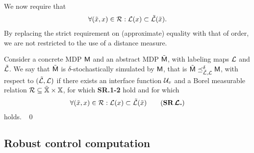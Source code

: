 \documentclass{ifacconf}
\begin{document}
 
We now require that \begin{equation}
  \forall (\tilde x,x )\in \mathcal{R}:  \mathcal{L}(x)\subset \tilde{\mathcal{L}}(\tilde x).
  \end{equation} 
By replacing the strict requirement on (approximate) equality with that of order,   we are not restricted to the use of a distance measure. %
 

\begin{definition}\label{def:apbsim}
Consider a concrete MDP $\mathsf{M}$ and an abstract  MDP $\tilde{\mathsf{M}}$, with labeling maps $\mathcal{L}$ and  $\tilde{\mathcal{L}}$.   
We say that	$\tilde{\mathsf{M}}$ is $\delta$-stochastically simulated by $\mathsf{M}$, that is $\tilde{\mathsf{M}}\preceq^{\delta}_{\tilde{\mathcal{L}},\mathcal{L}}\mathsf{M}$, with respect to $(\tilde{\mathcal{L}},\mathcal{L})$  if there exists an interface function $\mathcal{U}_{v}$ and
	a Borel measurable relation $\mathcal{R}\subseteq \tilde {{\mathbb{X}}}\times {\mathbb{X}}$, for which \textbf{SR.1-2} hold and for which 	\begin{equation}
	  \forall (\tilde x,x)\in \rel:  \Labset(x)\subset \tilde{\Labset}(\tilde x)
\tag{\textbf{SR$\,\boldsymbol{\CA{L}}$.}}
	\end{equation} 
holds. \hfill\mbox{ }\qed
\end{definition}





\subsection{Robust control computation}
\end{document}
